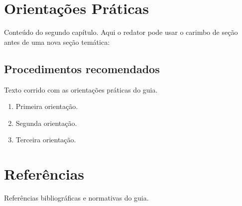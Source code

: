 \documentclass[guia]{crpsp_acessivel}
\begin{document}
\chapter{Orientações Práticas}

Conteúdo do segundo capítulo. Aqui o redator pode usar o carimbo
de seção antes de uma nova seção temática:

\carimbosecao

\section{Procedimentos recomendados}

Texto corrido com as orientações práticas do guia.

\begin{enumerate}
  \item Primeira orientação.
  \item Segunda orientação.
  \item Terceira orientação.
\end{enumerate}

\backmatter

\chapter*{Referências}

Referências bibliográficas e normativas do guia.
\end{document}
